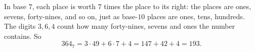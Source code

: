 In base $7$, each place is worth $7$ times the place to its right: the places are ones, sevens, forty-nines, and so on, just as base-$10$ places are ones, tens, hundreds. The digits $3,6,4$ count how many forty-nines, sevens and ones the number contains. So
\[364_7=3\cdot49+6\cdot7+4=147+42+4=\boxed{193}.\]
